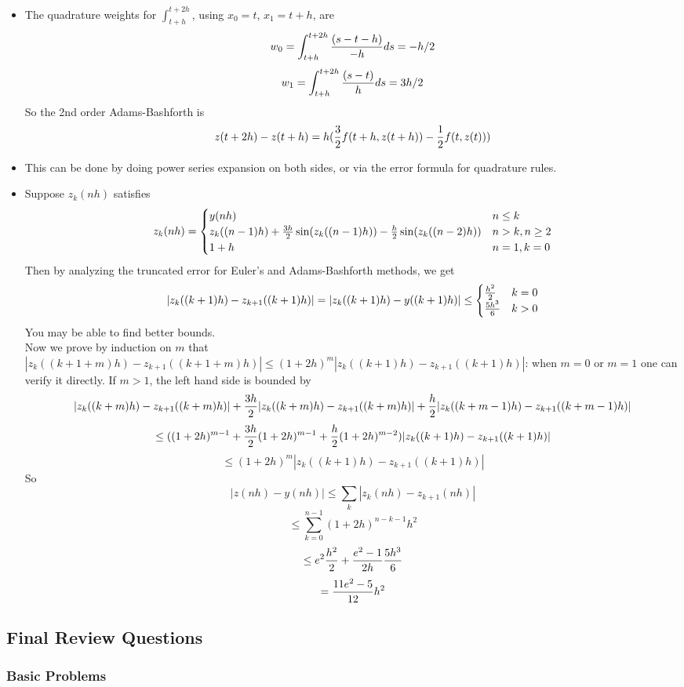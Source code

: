 \documentclass[20pt]{article} %
\theoremstyle{break}
\begin{document}
\begin{itemize}
\item The quadrature weights for $\int_{t+h}^{t+2h}$, using $x_0=t$, $x_1=t+h$, are
  \[w_0=\int_{t+h}^{t+2h}{(s-t-h)\over -h}ds=-h/2\]
  \[w_1=\int_{t+h}^{t+2h}{(s-t)\over h}ds=3h/2\]
  So the 2nd order Adams-Bashforth is
  \[z(t+2h)-z(t+h)=h({3\over 2}f(t+h, z(t+h))-{1\over 2}f(t, z(t)))\]
\item This can be done by doing power series expansion on both sides, or via the error formula for quadrature rules.
\item Suppose $z_k(nh)$ satisfies
  \[z_k(nh)=\begin{cases}y(nh) & n\leq k\\ z_k((n-1)h)+{3h\over 2}\sin(z_k((n-1)h))-{h\over 2}\sin(z_k((n-2)h)) & n>k, n\geq 2\\ 1+h & n=1, k=0 \end{cases}\]
  Then by analyzing the truncated error for Euler's and Adams-Bashforth methods, we get
  \[|z_k((k+1)h)-z_{k+1}((k+1)h)|=|z_k((k+1)h)-y((k+1)h)|\leq \begin{cases}{h^2\over 2} & k=0 \\ {5h^3\over 6} & k>0\end{cases}\]
  You may be able to find better bounds.\\

  Now we prove by induction on $m$ that $|z_k((k+1+m)h)-z_{k+1}((k+1+m)h)|\leq (1+2h)^m|z_k((k+1)h)-z_{k+1}((k+1)h)|$: when $m=0$ or $m=1$ one can verify it directly. If $m>1$, the left hand side is bounded by
  \[|z_k((k+m)h)-z_{k+1}((k+m)h)|+{3h\over 2}|z_k((k+m)h)-z_{k+1}((k+m)h)|+{h\over 2}|z_k((k+m-1)h)-z_{k+1}((k+m-1)h)|\]
  \[\leq ((1+2h)^{m-1}+{3h\over 2}(1+2h)^{m-1}+{h\over 2}(1+2h)^{m-2})|z_k((k+1)h)-z_{k+1}((k+1)h)|\]
  \[\leq (1+2h)^m|z_k((k+1)h)-z_{k+1}((k+1)h)|\]
  So
  \[|z(nh)-y(nh)|\leq \sum_k|z_k(nh)-z_{k+1}(nh)|\]
  \[\leq\sum_{k=0}^{n-1}(1+2h)^{n-k-1}h^2\]
  \[\leq e^2{h^2\over 2}+{e^2-1\over 2h}{5h^3\over 6}\]
  \[={11e^2-5\over 12}h^2\]
\end{itemize}

\subsection{Final Review Questions}

\subsubsection{Basic Problems}
\end{document}
